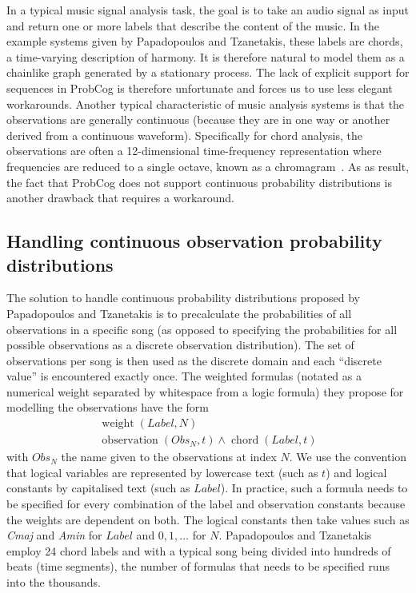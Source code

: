 \documentclass[letterpaper]{article} %
\begin{document}
In a typical music signal analysis task, the goal is to take an audio signal as input and return one or more labels that describe the content of the music. In the example systems given by Papadopoulos and Tzanetakis, these labels are chords, a time-varying description of harmony. It is therefore natural to model them as a chainlike graph generated by a stationary process. The lack of explicit support for sequences in ProbCog is therefore unfortunate and forces us to use less elegant workarounds. Another typical characteristic of music analysis systems is that the observations are generally continuous (because they are in one way or another derived from a continuous waveform). Specifically for chord analysis, the observations are often a 12-dimensional time-frequency representation where frequencies are reduced to a single octave, known as a chromagram~\cite{wakefield1999spie,fujishima1999icmc}. As as result, the fact that ProbCog does not support continuous probability distributions is another drawback that requires a workaround.

\subsection{Handling continuous observation probability distributions}
The solution to handle continuous probability distributions proposed by Papadopoulos and Tzanetakis is to precalculate the probabilities of all observations in a specific song (as opposed to specifying the probabilities for all possible observations as a discrete observation distribution). The set of observations per song is then used as the discrete domain and each ``discrete value''  is encountered exactly once. The weighted formulas (notated as a numerical weight separated by whitespace from a logic formula) they propose for modelling the observations have the form
\begin{multline}
\operatorname{weight}\left(Label,N\right) \\ \operatorname{observation}\left(Obs_{N}, t\right) \wedge \operatorname{chord}\left(Label, t\right)\label{eq:observation-formula}
\end{multline} with $Obs_{N}$ the name given to the observations at index $N$.
We use the convention that logical variables are represented by lowercase text (such as $t$) and logical constants by capitalised text (such as $Label$). In practice, such a formula needs to be specified for every combination of the label and observation constants because the weights are dependent on both. The logical constants then take values such as \emph{Cmaj} and \emph{Amin} for $Label$ and $0,1,\ldots$ for $N$. Papadopoulos and Tzanetakis employ 24 chord labels and with a typical song being divided into hundreds of beats (time segments), the number of formulas that needs to be specified runs into the thousands.
\end{document}
